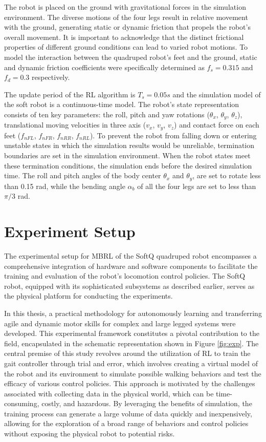 The robot is placed on the ground with gravitational forces in the simulation environment. The diverse motions of the four legs result in relative movement with the ground, generating static or dynamic friction that propels the robot's overall movement. It is important to acknowledge that the distinct frictional properties of different ground conditions can lead to varied robot motions. To model the interaction between the quadruped robot's feet and the ground, static and dynamic friction coefficients were specifically determined as $f_s = 0.315$ and $f_d = 0.3$ respectively.

The update period of the RL algorithm is $T_s = 0.05s$ and the simulation model of the soft robot is a continuous-time model. The robot's state representation consists of ten key parameters: the roll, pitch and yaw rotations ($\theta_x$, $\theta_y$, $\theta_z$), translational moving velocities in three axis ($v_x$, $v_y$, $v_z$) and contact force on each feet ($f_{nFL}$, $f_{nFR}$, $f_{nRR}$, $f_{nRL}$). To prevent the robot from falling down or entering unstable states in which the simulation results would be unreliable, termination boundaries are set in the simulation environment. When the robot states meet these termination conditions, the simulation ends before the desired simulation time. The roll and pitch angles of the body center $\theta_x$ and $\theta_y$, are set to rotate less than 0.15 rad, while the bending angle $\alpha_b$ of all the four legs are set to less than $\pi/3$ rad. 

\section{Experiment Setup}
The experimental setup for MBRL of the SoftQ quadruped robot encompasses a comprehensive integration of hardware and software components to facilitate the training and evaluation of the robot's locomotion control policies. The SoftQ robot, equipped with its sophisticated subsystems as described earlier, serves as the physical platform for conducting the experiments. 



In this thesis, a practical methodology for autonomously learning and transferring agile and dynamic motor skills for complex and large legged systems were developed. This experimental framework constitutes a pivotal contribution to the field, encapsulated in the schematic representation shown in Figure \ref{fig:exp}. The central premise of this study revolves around the utilization of \ac{RL} to train the gait controller through trial and error, which involves creating a virtual model of the robot and its environment to simulate possible walking behaviors and test the efficacy of various control policies. This approach is motivated by the challenges associated with collecting data in the physical world, which can be time-consuming, costly, and hazardous. By leveraging the benefits of simulation, the training process can generate a large volume of data quickly and inexpensively, allowing for the exploration of a broad range of behaviors and control policies without exposing the physical robot to potential risks.

